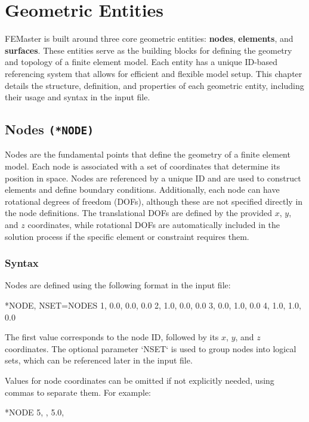 \chapter{Geometric Entities}
\label{chap:geometric_entities}

FEMaster is built around three core geometric entities: \textbf{nodes}, \textbf{elements}, and \textbf{surfaces}. These entities serve as the building blocks for defining the geometry and topology of a finite element model. Each entity has a unique ID-based referencing system that allows for efficient and flexible model setup. This chapter details the structure, definition, and properties of each geometric entity, including their usage and syntax in the input file.
\section{Nodes \texttt{(*NODE)}}
Nodes are the fundamental points that define the geometry of a finite element model. Each node is associated with a set of coordinates that determine its position in space. Nodes are referenced by a unique ID and are used to construct elements and define boundary conditions. Additionally, each node can have rotational degrees of freedom (DOFs), although these are not specified directly in the node definitions. The translational DOFs are defined by the provided $x$, $y$, and $z$ coordinates, while rotational DOFs are automatically included in the solution process if the specific element or constraint requires them.

\subsection{Syntax}
Nodes are defined using the following format in the input file:

\begin{codeBlock}
*NODE, NSET=NODES
1, 0.0, 0.0, 0.0
2, 1.0, 0.0, 0.0
3, 0.0, 1.0, 0.0
4, 1.0, 1.0, 0.0
\end{codeBlock}

The first value corresponds to the node ID, followed by its $x$, $y$, and $z$ coordinates.
The optional parameter `NSET` is used to group nodes into logical sets, which can be referenced later in the input file.

Values for node coordinates can be omitted if not explicitly needed, using commas to separate them. For example:

\begin{codeBlock}
*NODE
5, , 5.0,
\end{codeBlock}


